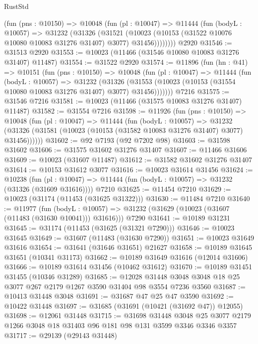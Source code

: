 \begin{lexlean}{RustStd}
\begin{coremodule}
        (fun (pns : @10150) =>
        @10048
          (fun (pl : @10047) =>
          @11444
            (fun (bodyL : @10057) =>
            @31232
              (@31326
                (@31521
                  (@10023 (@10153 (@31522 @10076 @10080 @10083 @31276 @31407) @3077) @31456))))))))
    @2920
@31546 := @31513 @2920
@31553 := @10023 (@11466 (@31546 @10080 @10083 @31276 @31407) @11487)
@31554 := @31522 @2920
@31574 := @11896
    (fun (hn : @41) =>
    @10151
      (fun (pns : @10150) =>
      @10048
        (fun (pl : @10047) =>
        @11444
          (fun (bodyL : @10057) =>
          @31232
            (@31326
              (@31553 (@10023 (@10153 (@31554 @10080 @10083 @31276 @31407) @3077) @31456)))))))
    @7216
@31575 := @31546 @7216
@31581 := @10023 (@11466 (@31575 @10083 @31276 @31407) @11487)
@31582 := @31554 @7216
@31598 := @11926
    (fun (pns : @10150) =>
    @10048
      (fun (pl : @10047) =>
      @11444
        (fun (bodyL : @10057) =>
        @31232 (@31326 (@31581 (@10023 (@10153 (@31582 @10083 @31276 @31407) @3077) @31456))))))
@31602 := @92 @7193 (@92 @7202 @98)
@31603 := @31598 @31602
@31606 := @31575 @31602 @31276 @31407
@31607 := @11466 @31606
@31609 := @10023 (@31607 @11487)
@31612 := @31582 @31602 @31276 @31407
@31614 := @10153 @31612 @3077
@31616 := @10023 @31614 @31456
@31624 := @10238
    (fun (pl : @10047) => @11444 (fun (bodyL : @10057) => @31232 (@31326 (@31609 @31616))))
    @7210
@31625 := @11454 @7210
@31629 := @10023 (@31174 (@11453 (@31625 @31322)))
@31630 := @11484 @7210
@31640 := @11977
    (fun (bodyL : @10057) => @31232 (@31629 (@10023 (@31607 (@11483 (@31630 @10041))) @31616)))
    @7290
@31641 := @10189 @31231
@31645 := @31174 (@11453 (@31625 (@31321 @7290)))
@31646 := @10023 @31645
@31649 := @31607 (@11483 (@31630 @7290))
@31651 := @10023 @31649 @31616
@31654 := @31641 (@31646 @31651) @21627
@31658 := @10189 @31645 @31651 (@10341 @31173)
@31662 := @10189 @31649 @31616 (@12014 @31606)
@31666 := @10189 @31614 @31456 (@10462 @31612)
@31670 := @10189 @31451 @31455 (@10346 @31289)
@31685 := @12028
    @31448
    @3048
    @3048
    @18
    @25
    @3077
    @267
    @2179
    @1267
    @3590
    @31404
    @98
    @3554
    @7236
    @3560
@31687 := @10413 @31448 @3048
@31691 := @31687 @47 @25 @47 @3590
@31692 := @10422 @31448
@31697 := @31685 (@31691 (@10421 (@31692 @47)) @12055)
@31698 := @12061 @31448
@31715 := @31698
    @31448
    @3048
    @25
    @3077
    @2179
    @1266
    @3048
    @18
    @31403
    @96
    @181
    @98
    @131
    @3599
    @3346
    @3346
    @3357
@31717 := @29139 (@29143 @31448)

\end{coremodule}
\end{lexlean}
